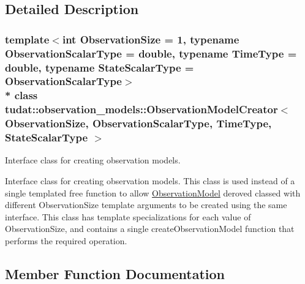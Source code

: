 \subsection{Detailed Description}
\subsubsection*{template$<$int Observation\+Size = 1, typename Observation\+Scalar\+Type = double, typename Time\+Type = double, typename State\+Scalar\+Type = Observation\+Scalar\+Type$>$\\*
class tudat\+::observation\+\_\+models\+::\+Observation\+Model\+Creator$<$ Observation\+Size, Observation\+Scalar\+Type, Time\+Type, State\+Scalar\+Type $>$}

Interface class for creating observation models. 

Interface class for creating observation models. This class is used instead of a single templated free function to allow \hyperlink{classtudat_1_1observation__models_1_1ObservationModel}{Observation\+Model} deroved classed with different Observation\+Size template arguments to be created using the same interface. This class has template specializations for each value of Observation\+Size, and contains a single create\+Observation\+Model function that performs the required operation. 

\subsection{Member Function Documentation}
